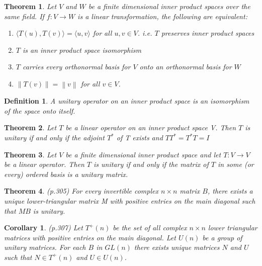 \documentclass{article}
\newcommand{\norm}[1]{\left\lVert#1\right\rVert}
\newcommand{\innerproduct}[1]{\langle#1\rangle}
\newtheorem{theorem}{Theorem}[section]
\newtheorem{definition}{Definition}[section]
\newtheorem{corollary}{Corollary}[theorem]
\numberwithin{theorem}{subsection} %
\numberwithin{definition}{subsection} %
\numberwithin{proposition}{subsection} %
\begin{document}
\begin{theorem}
    Let $V$ and $W$ be a finite dimensional inner product spaces over the same field.  If
    $f : V \rightarrow W$ is a linear transformation, the following are equivalent:

    \begin{enumerate}
        \item $\innerproduct{T(u),T(v)} = \innerproduct{u,v}$ for all $u,v \in V$. i.e. $T$ preserves inner product spaces
        \item $T$ is an inner product space isomorphism
        \item $T$ carries every orthonormal basis for $V$ onto an orthonormal basis for $W$
        \item $\norm{T(v)}=\norm{v}$ for all $v \in V$.
    \end{enumerate}
\end{theorem}

\begin{definition}
    A unitary operator on an inner product space is an isomorphism of the space onto
    itself.
\end{definition}

\begin{theorem}
    Let $T$ be a linear operator on an inner product space V. Then $T$ is unitary if and
    only if the adjoint $T^*$ of  T exists and $TT^*=T^*T = I$
\end{theorem}

\begin{theorem}
    Let $V$ be a finite dimensional inner product space and let $T: V \rightarrow V$ be
    a linear operator. Then $T$ is unitary if and only if the matrix of $T$ in some (or every) ordered basis is
a unitary matrix. 
\end{theorem}

\begin{theorem}
    (p.305)
    For every invertible complex $n \times n$ matrix $B$, there exists a unique lower-triangular
    matrix M with positive entries on the main diagonal such that $MB$ is unitary.
\end{theorem}

\begin{corollary}
    (p.307)
    Let $T^+(n)$ be the set of all complex $n \times n$ lower triangular matrices with
    positive entries on the main diagonal. Let $U(n)$ be a group of unitary matrices. For each $B$ in $GL(n)$ there exists unique matrices $N$ and $U$ such that $N \in
    T^+(n)$ and $U \in U(n)$.
\end{corollary}
\end{document}
